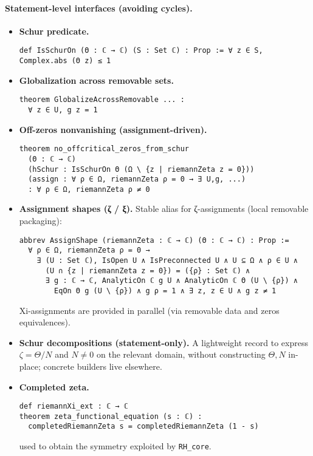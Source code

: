 \documentclass[11pt]{article}
\theoremstyle{plain}
\theoremstyle{definition}
\begin{document}
\paragraph{Statement-level interfaces (avoiding cycles).}
\begin{itemize}
  \item \textbf{Schur predicate.}
  
{\small
\begin{verbatim}
def IsSchurOn (Θ : ℂ → ℂ) (S : Set ℂ) : Prop := ∀ z ∈ S, Complex.abs (Θ z) ≤ 1
\end{verbatim}
}

  \item \textbf{Globalization across removable sets.}
  
{\small
\begin{verbatim}
theorem GlobalizeAcrossRemovable ... :
  ∀ z ∈ U, g z = 1
\end{verbatim}
}

  \item \textbf{Off-zeros nonvanishing (assignment-driven).}
  
{\small
\begin{verbatim}
theorem no_offcritical_zeros_from_schur
  (Θ : ℂ → ℂ)
  (hSchur : IsSchurOn Θ (Ω \ {z | riemannZeta z = 0}))
  (assign : ∀ ρ ∈ Ω, riemannZeta ρ = 0 → ∃ U,g, ...)
  : ∀ ρ ∈ Ω, riemannZeta ρ ≠ 0
\end{verbatim}
}

  \item \textbf{Assignment shapes (ζ / ξ).}
  Stable alias for ζ-assignments (local removable packaging):
  
{\small
\begin{verbatim}
abbrev AssignShape (riemannZeta : ℂ → ℂ) (Θ : ℂ → ℂ) : Prop :=
  ∀ ρ ∈ Ω, riemannZeta ρ = 0 →
    ∃ (U : Set ℂ), IsOpen U ∧ IsPreconnected U ∧ U ⊆ Ω ∧ ρ ∈ U ∧
      (U ∩ {z | riemannZeta z = 0}) = ({ρ} : Set ℂ) ∧
      ∃ g : ℂ → ℂ, AnalyticOn ℂ g U ∧ AnalyticOn ℂ Θ (U \ {ρ}) ∧
        EqOn Θ g (U \ {ρ}) ∧ g ρ = 1 ∧ ∃ z, z ∈ U ∧ g z ≠ 1
\end{verbatim}
}

  Xi-assignments are provided in parallel (via removable data and zeros equivalences).
  
  \item \textbf{Schur decompositions (statement-only).}
    A lightweight record to express \(\zeta=\Theta/N\) and \(N\neq 0\) on the relevant domain, without constructing \(\Theta,N\) in-place; concrete builders live elsewhere.
    
  \item \textbf{Completed zeta.}
  
{\small
\begin{verbatim}
def riemannXi_ext : ℂ → ℂ
theorem zeta_functional_equation (s : ℂ) :
  completedRiemannZeta s = completedRiemannZeta (1 - s)
\end{verbatim}
}

  used to obtain the symmetry exploited by \texttt{RH\_core}.
\end{itemize}
\end{document}
